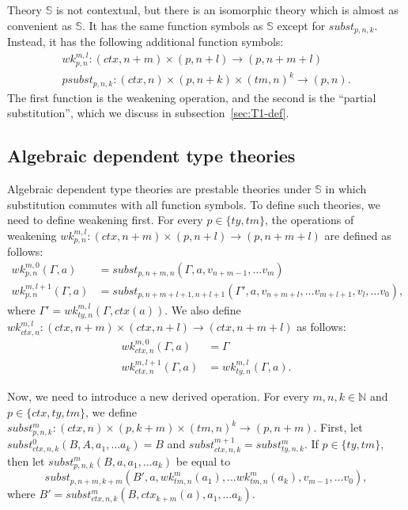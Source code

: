 \documentclass[reqno]{amsart}
\theoremstyle{definition}
\theoremstyle{remark}
\newcommand{\substTh}{\mathbb{S}}
\numberwithin{figure}{section}
\begin{document}
Theory $\substTh$ is not contextual, but there is an isomorphic theory which is almost as convenient as $\substTh$.
It has the same function symbols as $\substTh$ except for $subst_{p,n,k}$.
Instead, it has the following additional function symbols:
\begin{align*}
wk^{m,l}_{p,n} : (ctx,n+m) \times (p,n+l) \to (p,n+m+l) \\
psubst_{p,n,k} : (ctx,n) \times (p,n+k) \times (tm,n)^k \to (p,n).
\end{align*}
The first function is the weakening operation, and the second is the ``partial substitution'', which we discuss in subsection~\ref{sec:T1-def}.

\subsection{Algebraic dependent type theories}

Algebraic dependent type theories are prestable theories under $\substTh$ in which substitution commutes with all function symbols.
To define such theories, we need to define weakening first.
For every $p \in \{ty,tm\}$, the operations of weakening $wk^{m,l}_{p,n} : (ctx,n+m) \times (p,n+l) \to (p,n+m+l)$ are defined as follows:
\begin{align*}
wk^{m,0}_{p,n}(\Gamma,a) & = subst_{p,n+m,n}(\Gamma, a, v_{n+m-1}, \ldots v_m) \\
wk^{m,l+1}_{p,n}(\Gamma,a) & = subst_{p,n+m+l+1,n+l+1}(\Gamma', a, v_{n+m+l}, \ldots v_{m+l+1}, v_l, \ldots v_0),
\end{align*}
where $\Gamma' = wk^{m,l}_{ty,n}(\Gamma,ctx(a))$.
We also define $wk^{m,l}_{ctx,n} : (ctx,n+m) \times (ctx,n+l) \to (ctx,n+m+l)$ as follows:
\begin{align*}
wk^{m,0}_{ctx,n}(\Gamma,a) & = \Gamma \\
wk^{m,l+1}_{ctx,n}(\Gamma,a) & = wk^{m,l}_{ty,n}(\Gamma,a).
\end{align*}

Now, we need to introduce a new derived operation.
For every $m,n,k \in \mathbb{N}$ and $p \in \{ ctx, ty, tm \}$, we define $subst^m_{p,n,k} : (ctx,n) \times (p,k+m) \times (tm,n)^k \to (p,n+m)$.
First, let $subst^0_{ctx,n,k}(B, A, a_1, \ldots a_k) = B$ and $subst^{m+1}_{ctx,n,k} = subst^m_{ty,n,k}$.
If $p \in \{ ty, tm \}$, then let $subst^m_{p,n,k}(B, a, a_1, \ldots a_k)$ be equal to
\[ subst_{p,n+m,k+m}(B', a, wk^m_{tm,n}(a_1), \ldots wk^m_{tm,n}(a_k), v_{m-1}, \ldots v_0), \]
where $B' = subst^m_{ctx,n,k}(B, ctx_{k+m}(a), a_1, \ldots a_k)$.
\end{document}
